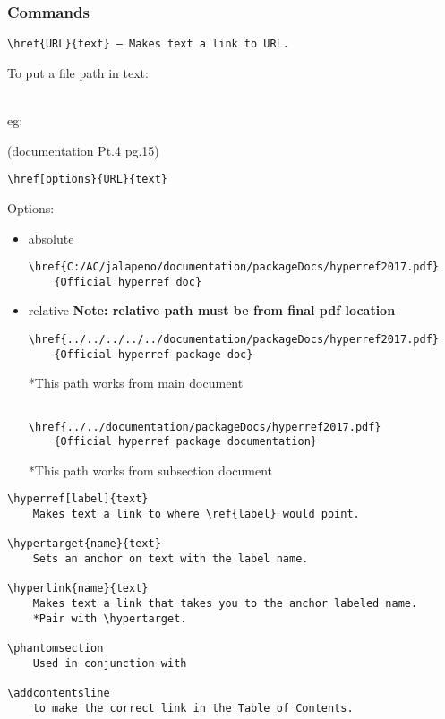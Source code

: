 \documentclass[class=article, crop=false, titlepage, twoside, multi={itemize, figure, verbatim}, float=false]{standalone}
\begin{document}
\subsubsection[Commands]{\Large Commands}
\begin{verbatim}
\href{URL}{text} — Makes text a link to URL.
\end{verbatim}

\begin{Large}To put a file path in text:\end{Large}\\
eg:


\begin{tiny}(documentation Pt.4 pg.15)\end{tiny}
\begin{verbatim}
\href[options}{URL}{text}
\end{verbatim}

Options:\begin{itemize}
\item absolute
\begin{footnotesize}
\begin{verbatim}
\href{C:/AC/jalapeno/documentation/packageDocs/hyperref2017.pdf}
    {Official hyperref doc}
\end{verbatim}
\end{footnotesize}

\item relative \textbf{Note: relative path must be from final pdf location}
\begin{footnotesize}
\begin{verbatim}
\href{../../../../../documentation/packageDocs/hyperref2017.pdf}
    {Official hyperref package doc}
\end{verbatim}
*This path works from main document
\begin{verbatim}

\href{../../documentation/packageDocs/hyperref2017.pdf}
    {Official hyperref package documentation}
\end{verbatim}
*This path works from subsection document

\end{footnotesize}

\end{itemize}

\begin{verbatim}
\hyperref[label]{text}
    Makes text a link to where \ref{label} would point.

\hypertarget{name}{text}
    Sets an anchor on text with the label name.

\hyperlink{name}{text}
    Makes text a link that takes you to the anchor labeled name.
    *Pair with \hypertarget.

\phantomsection
    Used in conjunction with

\addcontentsline
    to make the correct link in the Table of Contents.
\end{verbatim}
\end{document}
